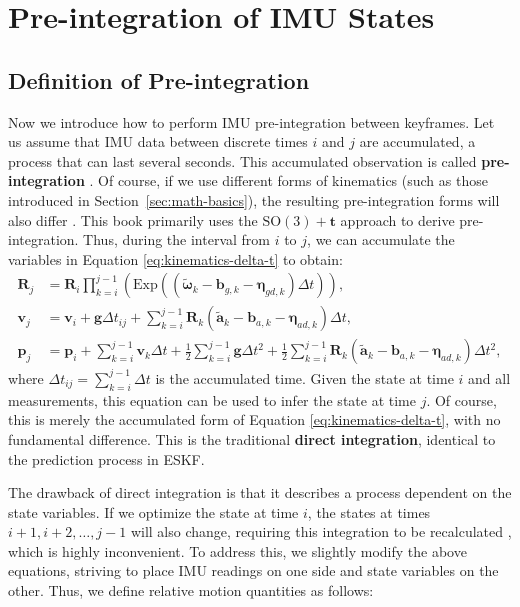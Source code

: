 \section{Pre-integration of IMU States}
\subsection{Definition of Pre-integration}
Now we introduce how to perform IMU pre-integration between keyframes. Let us assume that IMU data between discrete times $i$ and $j$ are accumulated, a process that can last several seconds. This accumulated observation is called \textbf{pre-integration} \cite{Lupton2011}. Of course, if we use different forms of kinematics (such as those introduced in Section~\ref{sec:math-basics}), the resulting pre-integration forms will also differ \cite{Qin2018}. This book primarily uses the $\mathrm{SO}(3)+\bm{t}$ approach to derive pre-integration. Thus, during the interval from $i$ to $j$, we can accumulate the variables in Equation \eqref{eq:kinematics-delta-t} to obtain:
\begin{subequations}
	\begin{align}
		\bm{R}_j &= \bm{R}_i \prod_{k=i}^{j-1} \left(\mathrm{Exp} \left(\left( \tilde{\boldsymbol{\omega}}_k - 
		\bm{b}_{g,k} - \boldsymbol{\eta}_{gd, k} \right) \Delta t \right)\right), \\
		\bm{v}_j &= \bm{v}_i + \bm{g} \Delta t_{ij} + \sum_{k=i}^{j-1} \bm{R}_k (\tilde{\bm{a}}_k - 
		\bm{b}_{a, k} - \boldsymbol{\eta}_{ad, k}) \Delta t, \\
		\bm{p}_j &= \bm{p}_i + \sum_{k=i}^{j-1} \bm{v}_k \Delta t + \frac{1}{2} \sum_{k=i}^{j-1} \bm{g} \Delta t^2 + 
		\frac{1}{2} \sum_{k=i}^{j-1} \bm{R}_k (\tilde{\bm{a}}_k - \bm{b}_{a,k} - \boldsymbol{\eta}_{ad, k}) 
		\Delta t^2,
	\end{align}
\end{subequations}
where $\Delta t_{ij} = \sum_{k=i}^{j-1} \Delta t$ is the accumulated time. Given the state at time $i$ and all measurements, this equation can be used to infer the state at time $j$. Of course, this is merely the accumulated form of Equation \eqref{eq:kinematics-delta-t}, with no fundamental difference. This is the traditional \textbf{direct integration}, identical to the prediction process in ESKF.

The drawback of direct integration is that it describes a process dependent on the state variables. If we optimize the state at time $i$, the states at times $i+1, i+2, \ldots, j-1$ will also change, requiring this integration to be recalculated \cite{Leutenegger2015}, which is highly inconvenient. To address this, we slightly modify the above equations, striving to place IMU readings on one side and state variables on the other. Thus, we define relative motion quantities as follows:

